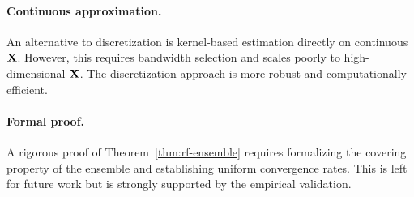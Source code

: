 \documentclass{article}
\newcommand{\PP}{\mathbb{P}}
\begin{document}
\paragraph{Continuous approximation.}
An alternative to discretization is kernel-based estimation directly on continuous $\mathbf{X}$. However, this requires bandwidth selection and scales poorly to high-dimensional $\mathbf{X}$. The discretization approach is more robust and computationally efficient.

\paragraph{Formal proof.}
A rigorous proof of Theorem~\ref{thm:rf-ensemble} requires formalizing the covering property of the ensemble and establishing uniform convergence rates. This is left for future work but is strongly supported by the empirical validation.



\end{document}

